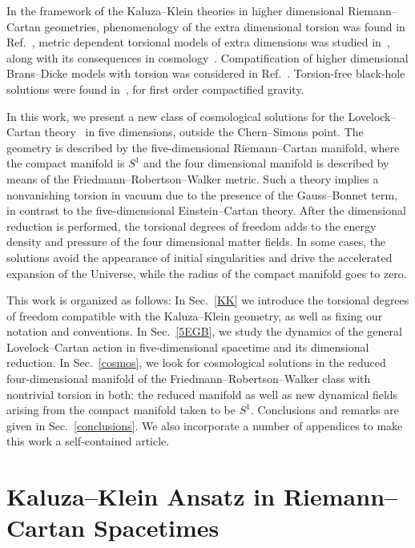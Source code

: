 \documentclass[aps,prd,12pt,superscriptaddress,showpacs,showkeys,longbibliography,reprint,nofootinbib]{revtex4-1}
\begin{document}
In the framework of the Kaluza--Klein theories in higher dimensional Riemann--Cartan geometries, phenomenology of the extra dimensional torsion was found in Ref.~\cite{Kalinowski:1980da}, metric dependent torsional models of extra dimensions was studied in~\cite{Shankar:2012vd}, along with its consequences in cosmology~\cite{Chen:2009ep}. Compatification of higher dimensional Brans--Dicke models with torsion was considered in Ref.~\cite{German:1993bq}. Torsion-free black-hole solutions were found in~\cite{Aros:2007nn}, for first order compactified gravity.

In this work, we present a new class of cosmological solutions for the Lovelock--Cartan theory~\cite{Mardones:1990qc} in five dimensions, outside the Chern--Simons point. The geometry is described by the five-dimensional Riemann--Cartan manifold, where the compact manifold is $S^1$ and the four dimensional manifold is described by means of the Friedmann--Robertson--Walker metric. Such a theory implies a nonvanishing torsion in vacuum due to the presence of the Gauss--Bonnet term, in contrast to the five-dimensional Einstein--Cartan theory. After the dimensional reduction is performed, the torsional degrees of freedom adds to the energy density and pressure of the four dimensional matter fields. In some cases, the solutions avoid the appearance of initial singularities and drive the accelerated expansion of the Universe, while the radius of the compact manifold goes to zero.  

This work is organized as follows: In Sec.~\ref{KK} we introduce the torsional degrees of freedom compatible with the Kaluza--Klein geometry, as well as fixing our notation and conventions. In Sec.~\ref{5EGB}, we study the dynamics of the general Lovelock--Cartan action in five-dimensional spacetime and its dimensional reduction. In Sec.~\ref{cosmos}, we look for cosmological solutions in the reduced four-dimensional manifold of the Friedmann--Robertson--Walker class with nontrivial torsion in both: the reduced manifold as well as new dynamical fields arising from the compact manifold taken to be $S^1$. Conclusions and remarks are given in Sec.~\ref{conclusions}. We also incorporate a number of appendices to make this work a self-contained article.


\section{Kaluza--Klein Ansatz in Riemann--Cartan Spacetimes\label{KK}}
\end{document}

